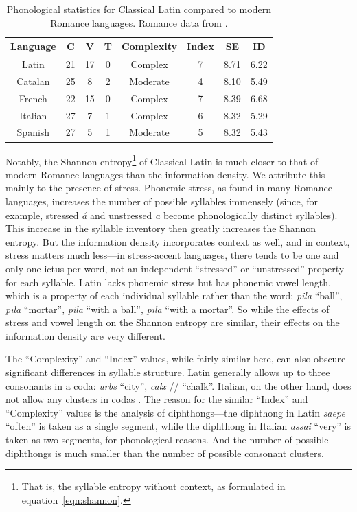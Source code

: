 \documentclass[12pt,twoside]{article}
\newcommand{\ipa}[1]{/\textipa{#1}/}
\begin{document}
\begin{table}[h]
\centering
\caption{Phonological statistics for Classical Latin compared to modern Romance languages. Romance data from \cite[44-45]{oh}.}
\label{tab:phono}
\begin{tabular}{|c|c|c|c|c|c|c|c|}
\hline
\textbf{Language} & \textbf{C} & \textbf{V} & \textbf{T} & \textbf{Complexity} & \textbf{Index} & \textbf{SE} & \textbf{ID} \\\hline
Latin & 21 & 17 & 0 & Complex & 7 & 8.71 & 6.22 \\\hline
Catalan & 25 & 8 & 2 & Moderate & 4 & 8.10 & 5.49 \\\hline
French & 22 & 15 & 0 & Complex & 7 & 8.39 & 6.68 \\\hline
Italian & 27 & 7 & 1 & Complex & 6 & 8.32 & 5.29 \\\hline
Spanish & 27 & 5 & 1 & Moderate & 5 & 8.32 & 5.43 \\\hline
\end{tabular}
\end{table}

Notably, the Shannon entropy\footnote{That is, the syllable entropy without context, as formulated in equation~\ref{eqn:shannon}.} of Classical Latin is much closer to that of modern Romance languages than the information density. We attribute this mainly to the presence of stress. Phonemic stress, as found in many Romance languages, increases the number of possible syllables immensely (since, for example, stressed \emph{\'a} and unstressed \emph{a} become phonologically distinct syllables). This increase in the syllable inventory then greatly increases the Shannon entropy. But the information density incorporates context as well, and in context, stress matters much less---in stress-accent languages, there tends to be one and only one ictus per word, not an independent ``stressed'' or ``unstressed'' property for each syllable. Latin lacks phonemic stress but has phonemic vowel length, which is a property of each individual syllable rather than the word: \emph{pila} ``ball'', \emph{p\=\i{}la} ``mortar'', \emph{pil\=a} ``with a ball'', \emph{p\=\i{}l\=a} ``with a mortar''. So while the effects of stress and vowel length on the Shannon entropy are similar, their effects on the information density are very different.

The ``Complexity'' and ``Index'' values, while fairly similar here, can also obscure significant differences in syllable structure. Latin generally allows up to three consonants in a coda: \emph{urbs} ``city'', \emph{calx} \ipa{calks} ``chalk''. Italian, on the other hand, does not allow any clusters in codas \citep{hall}. The reason for the similar ``Index'' and ``Complexity'' values is the analysis of diphthongs---the diphthong in Latin \emph{saepe} ``often'' is taken as a single segment, while the diphthong in Italian \emph{assai} ``very'' is taken as two segments, for phonological reasons. And the number of possible diphthongs is much smaller than the number of possible consonant clusters.
\end{document}
